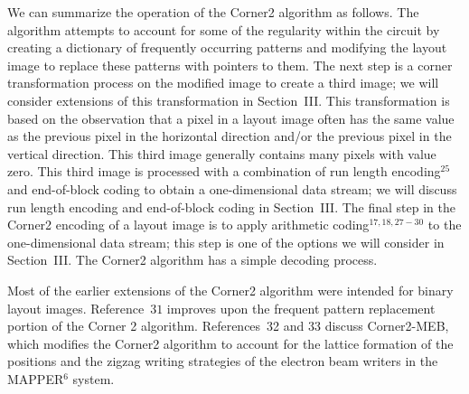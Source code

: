 \documentclass{article}
\begin{document}
We can summarize the operation of the Corner2 algorithm as follows.
The algorithm attempts to account for some of the regularity within the circuit
by creating a dictionary of frequently occurring patterns and modifying the
layout image to replace these patterns with pointers to them.
The next step is a corner transformation process on the modified image
to create a third image;  we will consider extensions of this transformation
in Section~III.  This transformation is based on the observation that a
pixel in a layout image often has the same value as the previous pixel in
the horizontal direction and/or the previous pixel in the vertical direction.
This third image generally contains many pixels with value
zero.  This third image is processed with a combination of run length 
encoding$^{25}$ and end-of-block coding to obtain a one-dimensional data
stream; we will discuss run length encoding and end-of-block coding in
Section~III.  The final step in the Corner2 encoding of a layout image is to
apply arithmetic coding$^{17, 18, 27-30}$ to the one-dimensional data stream;
this step is one of the options we will consider in Section~III.
The Corner2 algorithm has a simple decoding process.  

Most of the earlier extensions of the Corner2 algorithm were intended
for binary layout images.  Reference~$31$ improves upon the frequent pattern 
replacement portion of the Corner 2 algorithm.
References~32 and 33 discuss Corner2-MEB, which modifies the Corner2 
algorithm to account for the lattice
formation of the positions and the zigzag writing strategies of the electron
beam writers in the MAPPER$^6$ system.
\end{document}

